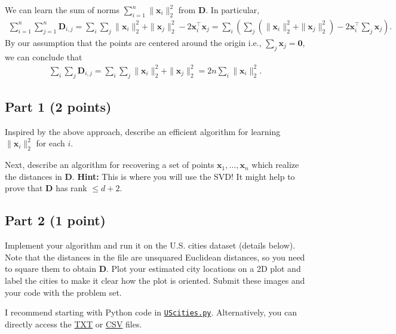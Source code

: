 \documentclass{article}
\begin{document}
We can learn the sum of norms $\sum_{i=1}^n \| \mathbf{x}_i\|_2^2$ from $\mathbf{D}$.
In particular,
\begin{align*}
\sum_{i=1}^n \sum_{j=1}^n \mathbf{D}_{i,j} = \sum_{i}\sum_{j}
\| \mathbf{x}_i \|_2^2  + \| \mathbf{x}_j \|_2^2 - 2 \mathbf{x}_i^\top \mathbf{x}_j =
\sum_{i} \left(\sum_{j} (\| \mathbf{x}_i \|_2^2  + \| \mathbf{x}_j \|_2^2)
- 2 \mathbf{x}_i^\top \sum_{j} \mathbf{x}_j \right).
\end{align*}
By our assumption that the points are centered around the origin i.e., $\sum_j \mathbf{x}_j = \mathbf{0}$, we can conclude that
\begin{align*}
\sum_{i}\sum_{j} \mathbf{D}_{i,j} = \sum_i \sum_j \| \mathbf{x}_i \|_2^2 + \| \mathbf{x}_j \|_2^2 = 2n \sum_i \| \mathbf{x}_i \|_2^2.
\end{align*}

\subsection*{Part 1 (2 points)}
Inspired by the above approach, describe an efficient algorithm for learning $\| \mathbf{x}_i \|_2^2$ for each $i$.

Next, describe an algorithm for recovering a set of points $\mathbf{x}_1,\ldots, \mathbf{x}_n$ which realize the distances in $\mathbf{D}$.
\textbf{Hint:} This is where you will use the SVD! It might help to prove that $\mathbf{D}$ has rank $\leq d + 2$.

\subsection*{Part 2 (1 point)}
Implement your algorithm and run it on the U.S. cities dataset (details below).
Note that the distances in the file are unsquared Euclidean distances, so you need to square them to obtain $\mathbf{D}$. Plot your  estimated city locations on a 2D plot and label the cities to make it clear how the plot is oriented. Submit these images and your code with the problem set.

I recommend starting with Python code in \href{https://www.rtealwitter.com/rads2024/psets/UScities.py}{\texttt{UScities.py}}.
Alternatively, you can directly access the \href{https://www.rtealwitter.com/rads2024/psets/UScities.txt}{TXT}
or
\href{https://www.rtealwitter.com/rads2024/psets/UScities.csv}{CSV} files.


%

\newpage
\end{document}
